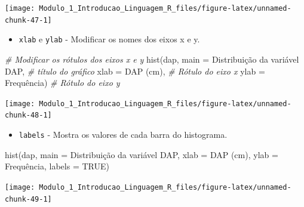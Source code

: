 \documentclass[
]{article}
\newenvironment{Shaded}{\begin{snugshade}}{\end{snugshade}}
\newcommand{\AttributeTok}[1]{\textcolor[rgb]{0.77,0.63,0.00}{#1}}
\newcommand{\CommentTok}[1]{\textcolor[rgb]{0.56,0.35,0.01}{\textit{#1}}}
\newcommand{\ConstantTok}[1]{\textcolor[rgb]{0.00,0.00,0.00}{#1}}
\newcommand{\FunctionTok}[1]{\textcolor[rgb]{0.00,0.00,0.00}{#1}}
\newcommand{\NormalTok}[1]{#1}
\newcommand{\StringTok}[1]{\textcolor[rgb]{0.31,0.60,0.02}{#1}}
\providecommand{\tightlist}{%
  \setlength{\itemsep}{0pt}\setlength{\parskip}{0pt}}
\begin{document}
\begin{center}\texttt{[image: Modulo\_1\_Introducao\_Linguagem\_R\_files/figure-latex/unnamed-chunk-47-1]} \end{center}

\begin{itemize}
\tightlist
\item
  \texttt{xlab} e \texttt{ylab} - Modificar os nomes dos eixos x e y.
\end{itemize}

\begin{Shaded}
\begin{Highlighting}[]
\CommentTok{\# Modificar os rótulos dos eixos x e y}
\FunctionTok{hist}\NormalTok{(dap, }
     \AttributeTok{main =} \StringTok{\textquotesingle{}Distribuição da variável DAP\textquotesingle{}}\NormalTok{, }\CommentTok{\# título do gráfico}
    \AttributeTok{xlab =} \StringTok{\textquotesingle{}DAP (cm)\textquotesingle{}}\NormalTok{,   }\CommentTok{\# Rótulo do eixo x}
    \AttributeTok{ylab =} \StringTok{\textquotesingle{}Frequência\textquotesingle{}}\NormalTok{) }\CommentTok{\# Rótulo do eixo y}
\end{Highlighting}
\end{Shaded}

\begin{center}\texttt{[image: Modulo\_1\_Introducao\_Linguagem\_R\_files/figure-latex/unnamed-chunk-48-1]} \end{center}

\begin{itemize}
\tightlist
\item
  \texttt{labels} - Mostra os valores de cada barra do histograma.
\end{itemize}

\begin{Shaded}
\begin{Highlighting}[]
\FunctionTok{hist}\NormalTok{(dap, }
     \AttributeTok{main =} \StringTok{\textquotesingle{}Distribuição da variável DAP\textquotesingle{}}\NormalTok{,}
    \AttributeTok{xlab =} \StringTok{\textquotesingle{}DAP (cm)\textquotesingle{}}\NormalTok{,}
    \AttributeTok{ylab =} \StringTok{\textquotesingle{}Frequência\textquotesingle{}}\NormalTok{,}
    \AttributeTok{labels =} \ConstantTok{TRUE}\NormalTok{)}
\end{Highlighting}
\end{Shaded}

\begin{center}\texttt{[image: Modulo\_1\_Introducao\_Linguagem\_R\_files/figure-latex/unnamed-chunk-49-1]} \end{center}
\end{document}
